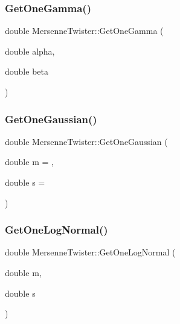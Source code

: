 \hypertarget{classMersenneTwister_afdc783e314837717b1848d448e12f2fd}{}\label{classMersenneTwister_afdc783e314837717b1848d448e12f2fd} 
\subsubsection{\texorpdfstring{Get\+One\+Gamma()}{GetOneGamma()}}
{\footnotesize\ttfamily double Mersenne\+Twister\+::\+Get\+One\+Gamma (\begin{DoxyParamCaption}\item[{double}]{alpha,  }\item[{double}]{beta }\end{DoxyParamCaption})}

\hypertarget{classMersenneTwister_af0952f4bcd26592bc676638b441655c4}{}\label{classMersenneTwister_af0952f4bcd26592bc676638b441655c4} 
\subsubsection{\texorpdfstring{Get\+One\+Gaussian()}{GetOneGaussian()}}
{\footnotesize\ttfamily double Mersenne\+Twister\+::\+Get\+One\+Gaussian (\begin{DoxyParamCaption}\item[{double}]{m = {},  }\item[{double}]{s = {} }\end{DoxyParamCaption})}

\hypertarget{classMersenneTwister_a555e8ce9fda71fae485a4fb85a503334}{}\label{classMersenneTwister_a555e8ce9fda71fae485a4fb85a503334} 
\subsubsection{\texorpdfstring{Get\+One\+Log\+Normal()}{GetOneLogNormal()}}
{\footnotesize\ttfamily double Mersenne\+Twister\+::\+Get\+One\+Log\+Normal (\begin{DoxyParamCaption}\item[{double}]{m,  }\item[{double}]{s }\end{DoxyParamCaption})}

